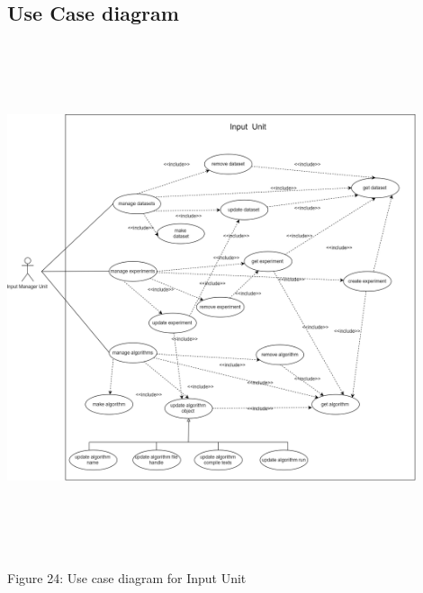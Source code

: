 \subsection{Use Case diagram}
   \includegraphics[width=12cm,height=15cm,keepaspectratio]{input_unit/images/input_unit_use_case.png}
    \begin{center}
    	\small{Figure 24: Use case diagram for Input Unit}
    \end{center}